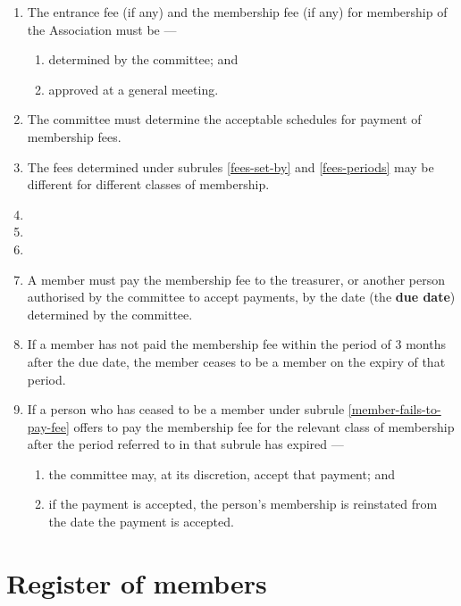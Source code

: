 \documentclass[../constitution.tex]{subfiles}
\begin{document}
\begin{enumerate}


\item \label{fees-set-by} The entrance fee (if any) and the membership fee (if any) for membership of the Association must be ---
\begin{enumerate}
  \item determined by the committee; and
  \item approved at a general meeting.
\end{enumerate}

\item \label{fees-periods} The committee must determine the acceptable schedules for payment of membership fees.


\item The fees determined under subrules \ref{fees-set-by} and \ref{fees-periods} may be different for different classes of membership.

\item 
\item 
\item 
\item A member must pay the membership fee to the treasurer, or another person authorised by the committee to accept payments, by the date (the \textbf{due date}) determined by the committee. \label{member-must-pay-fee}
\item If a member has not paid the membership fee within the period of 3 months after the due date, the member ceases to be a member on the expiry of that period. \label{member-fails-to-pay-fee}
\item \label{member-rejoins-after-failing-to-pay-fee} If a person who has ceased to be a member under subrule \ref{member-fails-to-pay-fee} offers to pay the membership fee for the relevant class of membership after the period referred to in that subrule has expired ---

  \begin{enumerate}
  
  \item the committee may, at its discretion, accept that payment; and
  \item if the payment is accepted, the person's membership is reinstated from the date the payment is accepted.
  \end{enumerate}
\end{enumerate}

\hypertarget{division-3-register-of-members}{%
\section{Register of members}\label{division-3-register-of-members}}
\end{document}
